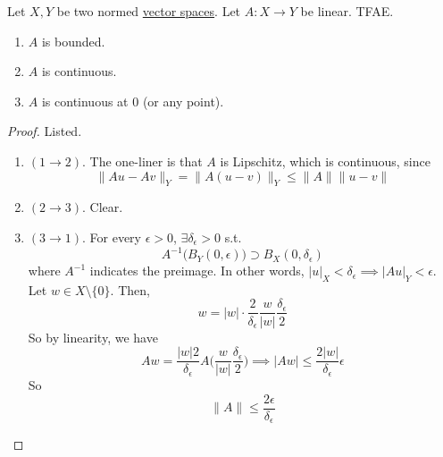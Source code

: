   \begin{theorem}[1.2.2.]
    \label{thm:1-2-2}
    Let $X, Y$ be two normed \hyperref[lin-def:vector-space]{vector spaces}. Let $A: X \to Y$ be linear. TFAE. 
    \begin{enumerate}
      \item $A$ is bounded. 
      \item $A$ is continuous. 
      \item $A$ is continuous at $0$ (or any point). 
    \end{enumerate}
  \end{theorem}
  \begin{proof}
    Listed. 
    \begin{enumerate}
      \item $(1 \to 2)$. The one-liner is that $A$ is Lipschitz, which is continuous, since 
        \begin{equation}
          \| Au - Av \|_Y = \| A(u - v) \|_Y \leq \|A\| \|u - v\|
        \end{equation}
      \item $(2 \to 3)$. Clear. 
      \item $(3 \to 1)$. For every $\epsilon > 0$, $\exists \delta_\epsilon > 0$ s.t. 
        \begin{equation}
          A^{-1} \big( B_Y (0, \epsilon) \big) \supset B_X (0, \delta_\epsilon)
        \end{equation}
        where $A^{-1}$ indicates the preimage. In other words, $|u|_X < \delta_\epsilon \implies |Au|_Y < \epsilon$. Let $w \in X \setminus \{0\}$. Then, 
        \begin{equation}
          w = |w| \cdot \frac{2}{\delta_\epsilon} \frac{w}{|w|} \frac{\delta_\epsilon}{2}
        \end{equation}
        So by linearity, we have 
        \begin{equation}
          Aw = \frac{|w| 2}{\delta_\epsilon} A \bigg( \frac{w}{|w|} \frac{\delta_\epsilon}{2} \bigg) \implies |A w| \leq \frac{2 |w|}{\delta_\epsilon} \epsilon
        \end{equation}
        So 
        \begin{equation}
          \|A\| \leq \frac{2 \epsilon}{\delta_\epsilon}
        \end{equation}
    \end{enumerate}
  \end{proof}

